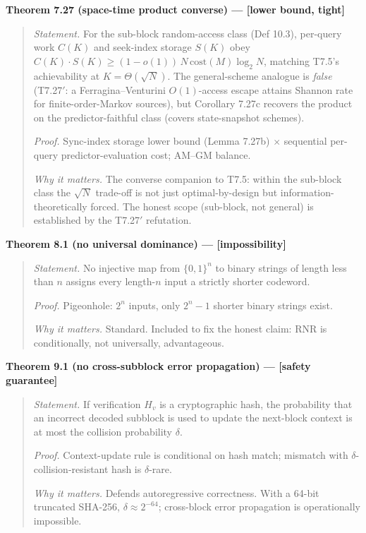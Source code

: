 \documentclass[
]{article}
\begin{document}
\textbf{Theorem 7.27 (space-time product converse) --- {[}lower
bound, tight{]}}

\begin{quote}
\emph{Statement.} For the sub-block random-access class (Def 10.3),
per-query work $C(K)$ and seek-index storage $S(K)$ obey
$C(K)\cdot S(K) \geq (1-o(1))\,N\,\mathrm{cost}(M)\log_2 N$, matching
T7.5's achievability at $K=\Theta(\sqrt N)$. The general-scheme
analogue is \emph{false} (T7.27$'$: a Ferragina--Venturini
$O(1)$-access escape attains Shannon rate for finite-order-Markov
sources), but Corollary 7.27c recovers the product on the
predictor-faithful class (covers state-snapshot schemes).

\emph{Proof.} Sync-index storage lower bound (Lemma 7.27b) $\times$
sequential per-query predictor-evaluation cost; AM--GM balance.

\emph{Why it matters.} The converse companion to T7.5: within the
sub-block class the $\sqrt N$ trade-off is not just optimal-by-design
but information-theoretically forced. The honest scope (sub-block,
not general) is established by the T7.27$'$ refutation.
\end{quote}

\textbf{Theorem 8.1 (no universal dominance) --- {[}impossibility{]}}

\begin{quote}
\emph{Statement.} No injective map from $\{0,1\}^n$ to binary
strings of length less than $n$ assigns every length-$n$ input a
strictly shorter codeword.

\emph{Proof.} Pigeonhole: $2^n$ inputs, only $2^n - 1$ shorter
binary strings exist.

\emph{Why it matters.} Standard. Included to fix the honest claim: RNR
is conditionally, not universally, advantageous.
\end{quote}

\textbf{Theorem 9.1 (no cross-subblock error propagation) --- {[}safety
guarantee{]}}

\begin{quote}
\emph{Statement.} If verification $H_v$ is a cryptographic hash, the
probability that an incorrect decoded subblock is used to update the
next-block context is at most the collision probability $\delta$.

\emph{Proof.} Context-update rule is conditional on hash match;
mismatch with $\delta$-collision-resistant hash is $\delta$-rare.

\emph{Why it matters.} Defends autoregressive correctness. With a
64-bit truncated SHA-256, $\delta \approx 2^{-64}$; cross-block
error propagation is operationally impossible.
\end{quote}
\end{document}
